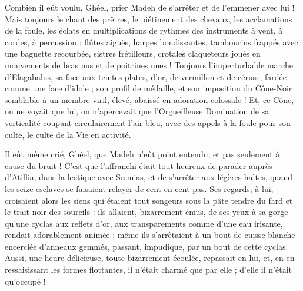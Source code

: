 \documentclass[a4paper, 11pt, oneside, polutonikogreek, french]{article}
\begin{document}
Combien il eût voulu, Ghéel, prier Madeh de s'arrêter et de l'emmener avec lui ! Mais toujours le chant des prêtres, le piétinement des chevaux, les acclamations de la foule, les éclats en multiplications de rythmes des instruments à vent, à cordes, à percussion : flûtes aiguës, harpes bondissantes, tambourins frappés avec une baguette recourbée, sistres frétilleurs, crotales claqueteurs joués en mouvements de bras nus et de poitrines nues ! Toujours l'imperturbable marche d'Elagabalus, sa face aux teintes plates, d'or, de vermillon et de céruse, fardée comme une face d'idole ; son profil de médaille, et son imposition du Cône-Noir semblable à un membre viril, élevé, abaissé en adoration colossale ! Et, ce Cône, on ne voyait que lui, on n'apercevait que l'Orgueilleuse Domination de sa verticalité coupant circulairement l'air bleu, avec des appels à la foule pour son culte, le culte de la Vie en activité.

Il eût même crié, Ghéel, que Madeh n'eût point entendu, et pas seulement à cause du bruit ! C'est que l'affranchi était tout heureux de parader auprès d'Atillia, dans la lectique avec Sœmias, et de s'arrêter aux légères haltes, quand les seize esclaves se faisaient relayer de cent en cent pas. Ses regards, à lui, croisaient alors les siens qui étaient tout songeurs sous la pâte tendre du fard et le trait noir des sourcils : ils allaient, bizarrement émus, de ses yeux à sa gorge qu'une cyclas aux reflets d'or, aux transparements comme d'une eau irisante, rendait adorablement animée ; même ils s'arrêtaient à un bout de cuisse blanche encerclée d'anneaux gemmés, passant, impudique, par un bout de cette cyclas. Aussi, une heure délicieuse, toute bizarrement écoulée, repassait en lui, et, en en ressaisissant les formes flottantes, il n'était charmé que par elle ; d'elle il n'était qu'occupé !
\clearpage
\subsection{}
\end{document}
